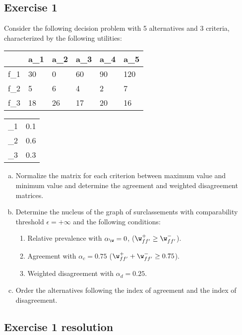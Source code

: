\documentclass[\main/main.tex]{subfiles}
\begin{document}
\subsection{Exercise 1}
Consider the following decision problem with 5 alternatives and 3 criteria, characterized by the following utilities:

\begin{table}
  \begin{tabular}{L|LLLLL}
     & a_1 & a_2 & a_3 & a_4 & a_5 \\
    \hline
    f_1               & 30  & 0   & 60  & 90  & 120 \\
    f_2               & 5   & 6   & 4   & 2   & 7   \\
    f_3               & 18  & 26  & 17  & 20  & 16
  \end{tabular}
  \begin{tabular}{L|L}
         &  \\
    \hline
    \w_1 & 0.1            \\
    \w_2 & 0.6            \\
    \w_3 & 0.3
  \end{tabular}
\end{table}

\begin{enumerate}[a)]
  \item Normalize the matrix for each criterion between maximum value and minimum value and determine the agreement and weighted disagreement matrices.
  \item Determine the nucleus of the graph of surclassements with comparability threshold $\epsilon=+\infty$ and the following conditions:
        \begin{enumerate}[1)]
          \item Relative prevalence with $\alpha_{\w}=0$, ($\w^+_{ff'}\geq \w^-_{ff'}$).
          \item Agreement with $\alpha_c=0.75$ ($\w^+_{ff'}+\w^-_{ff'}\geq 0.75$).
          \item Weighted disagreement with $\alpha_d=0.25$.
        \end{enumerate}
  \item Order the alternatives following the index of agreement and the index of disagreement.
\end{enumerate}

\subsection{Exercise 1 resolution}
\end{document}
